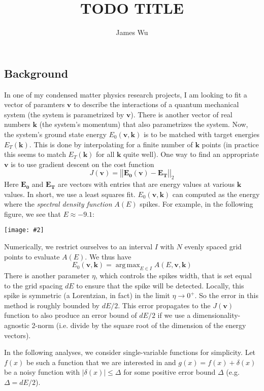 \documentclass[letterpaper,11pt]{article}
\title{TODO TITLE}
\author{James Wu \quad 92277235}
\date{}
\newcommand*{\abs}[1]{\left| #1 \right|}
\newcommand*{\norm}[1]{\abs{\abs{\mathbf{#1}}}}
\DeclareMathOperator*{\argmax}{arg\,max}
\newcommand*{\qimg}[2]{\\ \begin{center}\texttt{[image: \#2]}\end{center}}
\begin{document}
\maketitle
\begin{flushleft}
    
    \section{Background}
    In one of my condensed matter physics research projects, I am looking to fit a vector of paramters $\mathbf{v}$ to describe the interactions of a quantum mechanical system (the system is parametrized by $\mathbf{v}$). There is another vector of real numbers $\mathbf{k}$ (the system's momentum) that also parametrizes the system. Now, the system's ground state energy $E_0(\mathbf{v}, \mathbf{k})$ is to be matched with target energies $E_T(\mathbf{k})$. This is done by interpolating for a finite number of $\mathbf{k}$ points (in practice this seems to match $E_T(\mathbf{k})$ for all $\mathbf{k}$ quite well). One way to find an appropriate $\mathbf{v}$ is to use gradient descent on the cost function
    $$J(\mathbf{v}) = \norm{\mathbf{E_0}(\mathbf{v}) - \mathbf{E_T}}_2$$
    Here $\mathbf{E_0}$ and $\mathbf{E_T}$ are vectors with entries that are energy values at various $\mathbf{k}$ values. In short, we use a least squares fit. $E_0(\mathbf{v}, \mathbf{k})$ can computed as the energy where the \textit{spectral density function} $A(E)$ spikes. For example, in the following figure, we see that $E \approx -9.1$:
    \qimg{0.8}{img/spec.jpg}
    Numerically, we restrict ourselves to an interval $I$ with $N$ evenly spaced grid points to evaluate $A(E)$. We thus have
    $$E_0(\mathbf{v}, \mathbf{k}) = \argmax_{E \in I} A(E, \mathbf{v}, \mathbf{k})$$
    There is another parameter $\eta$, which controls the spikes width, that is set equal to the grid spacing $dE$ to ensure that the spike will be detected. Locally, this spike is symmetric (a Lorentzian, in fact) in the limit $\eta \to 0^+$. So the error in this method is roughly bounded by $dE/2$. This error propagates to the $J(\mathbf{v})$ function to also produce an error bound of $dE/2$ if we use a dimensionality-agnostic 2-norm (i.e. divide by the square root of the dimension of the energy vectors).

    In the following analyses, we consider single-variable functions for simplicity. Let $f(x)$ be such a function that we are interested in and $g(x) = f(x) + \delta(x)$ be a noisy function with $|\delta(x)| \leq \Delta$ for some positive error bound $\Delta$ (e.g. $\Delta = dE/2$).


\end{flushleft}
\end{document}
